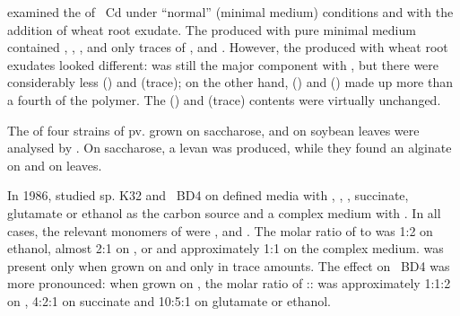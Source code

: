 \textcite{Fischer2003} examined the \eps{} of ~Cd under \enquote{normal} (minimal medium) conditions and with the addition of wheat root exudate. The \eps{} produced with pure minimal medium contained  \glc{},  \fuc{},  \gal{},  \rha{} and only traces of \xyl{}, \man{} and \lara{}. However, the \eps{} produced with wheat root exudates looked different: \glc{} was still the major component with , but there were considerably less \fuc{} () and \rha{} (trace); on the other hand, \xyl{} () and \lara{} () made up more than a fourth of the polymer. The \gal{} () and \man{} (trace) contents were virtually unchanged.

The \eps{} of four strains of  pv.  grown on saccharose, \glc{} and on soybean leaves were analysed by \textcite{Osman1986}. On saccharose, a levan was produced, while they found an alginate on \glc{} and on leaves.

In 1986, \textcite{Bryan1986} studied  sp. K32 and ~BD4 on defined media with \glc{}, \man{}, \rha{}, succinate, glutamate or ethanol as the carbon source and a complex medium with \glc{}. In all cases, the relevant monomers of  \eps{} were \gal{}, \man{} and \rha{}. The molar ratio of \rha{} to \gal{} was 1:2 on ethanol, almost 2:1 on \glc{}, \man{} or \rha{} and approximately 1:1 on the complex medium. \MAN{} was present only when grown on \rha{} and only in trace amounts. The effect on ~BD4 was more pronounced: when grown on \rha{}, the molar ratio of \rha{}:\glc{}:\man{} was approximately 1:1:2 on \rha{}, 4:2:1 on succinate and 10:5:1 on glutamate or ethanol.

